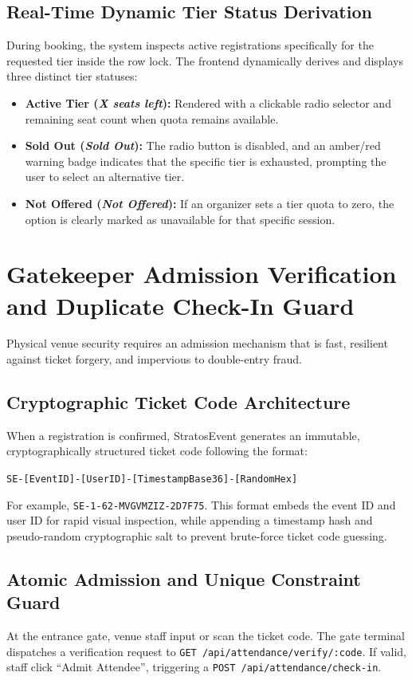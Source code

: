 \documentclass[11pt,a4paper]{report}
\begin{document}
\subsection{Real-Time Dynamic Tier Status Derivation}
During booking, the system inspects active registrations specifically for the requested tier inside the row lock. The frontend dynamically derives and displays three distinct tier statuses:
\begin{itemize}[leftmargin=1.5em, itemsep=0.3em]
    \item \textbf{Active Tier (\textit{X seats left}):} Rendered with a clickable radio selector and remaining seat count when quota remains available.
    \item \textbf{Sold Out (\textit{Sold Out}):} The radio button is disabled, and an amber/red warning badge indicates that the specific tier is exhausted, prompting the user to select an alternative tier.
    \item \textbf{Not Offered (\textit{Not Offered}):} If an organizer sets a tier quota to zero, the option is clearly marked as unavailable for that specific session.
\end{itemize}

\section{Gatekeeper Admission Verification and Duplicate Check-In Guard}
\justifying
Physical venue security requires an admission mechanism that is fast, resilient against ticket forgery, and impervious to double-entry fraud.

\subsection{Cryptographic Ticket Code Architecture}
When a registration is confirmed, StratosEvent generates an immutable, cryptographically structured ticket code following the format:
\begin{center}
\texttt{SE-[EventID]-[UserID]-[TimestampBase36]-[RandomHex]}
\end{center}
For example, \texttt{SE-1-62-MVGVMZIZ-2D7F75}. This format embeds the event ID and user ID for rapid visual inspection, while appending a timestamp hash and pseudo-random cryptographic salt to prevent brute-force ticket code guessing.

\subsection{Atomic Admission and Unique Constraint Guard}
At the entrance gate, venue staff input or scan the ticket code. The gate terminal dispatches a verification request to \texttt{GET /api/attendance/verify/:code}. If valid, staff click ``Admit Attendee'', triggering a \texttt{POST /api/attendance/check-in}.
\end{document}
